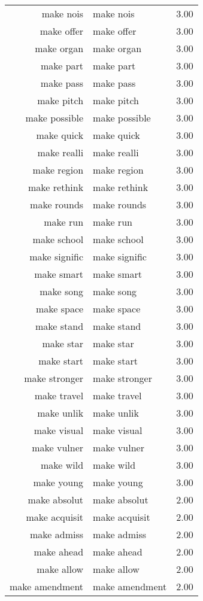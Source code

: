 \begin{table}[ht]
\begin{tabular}{rlr}
  make nois & make nois & 3.00 \\ 
  make offer & make offer & 3.00 \\ 
  make organ & make organ & 3.00 \\ 
  make part & make part & 3.00 \\ 
  make pass & make pass & 3.00 \\ 
  make pitch & make pitch & 3.00 \\ 
  make possible & make possible & 3.00 \\ 
  make quick & make quick & 3.00 \\ 
  make realli & make realli & 3.00 \\ 
  make region & make region & 3.00 \\ 
  make rethink & make rethink & 3.00 \\ 
  make rounds & make rounds & 3.00 \\ 
  make run & make run & 3.00 \\ 
  make school & make school & 3.00 \\ 
  make signific & make signific & 3.00 \\ 
  make smart & make smart & 3.00 \\ 
  make song & make song & 3.00 \\ 
  make space & make space & 3.00 \\ 
  make stand & make stand & 3.00 \\ 
  make star & make star & 3.00 \\ 
  make start & make start & 3.00 \\ 
  make stronger & make stronger & 3.00 \\ 
  make travel & make travel & 3.00 \\ 
  make unlik & make unlik & 3.00 \\ 
  make visual & make visual & 3.00 \\ 
  make vulner & make vulner & 3.00 \\ 
  make wild & make wild & 3.00 \\ 
  make young & make young & 3.00 \\ 
  make absolut & make absolut & 2.00 \\ 
  make acquisit & make acquisit & 2.00 \\ 
  make admiss & make admiss & 2.00 \\ 
  make ahead & make ahead & 2.00 \\ 
  make allow & make allow & 2.00 \\ 
  make amendment & make amendment & 2.00 \\ 

\end{tabular}
\end{table}

